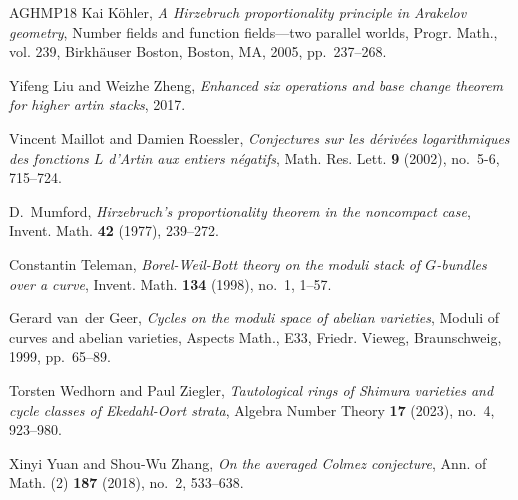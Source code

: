 \documentclass[reqno]{amsart}
\numberwithin{equation}{subsection}
\theoremstyle{definition}
\begin{document}
\begin{thebibliography}{AGHMP18}
Kai K\"{o}hler, \emph{A {H}irzebruch proportionality principle in {A}rakelov
  geometry}, Number fields and function fields---two parallel worlds, Progr.
  Math., vol. 239, Birkh\"{a}user Boston, Boston, MA, 2005, pp.~237--268.

Yifeng Liu and Weizhe Zheng, \emph{Enhanced six operations and base change
  theorem for higher artin stacks}, 2017.

Vincent Maillot and Damien Roessler, \emph{Conjectures sur les d\'{e}riv\'{e}es
  logarithmiques des fonctions {$L$} d'{A}rtin aux entiers n\'{e}gatifs}, Math.
  Res. Lett. \textbf{9} (2002), no.~5-6, 715--724.

D.~Mumford, \emph{Hirzebruch's proportionality theorem in the noncompact case},
  Invent. Math. \textbf{42} (1977), 239--272.

Constantin Teleman, \emph{Borel-{W}eil-{B}ott theory on the moduli stack of
  {$G$}-bundles over a curve}, Invent. Math. \textbf{134} (1998), no.~1, 1--57.

Gerard van~der Geer, \emph{Cycles on the moduli space of abelian varieties},
  Moduli of curves and abelian varieties, Aspects Math., E33, Friedr. Vieweg,
  Braunschweig, 1999, pp.~65--89.

Torsten Wedhorn and Paul Ziegler, \emph{Tautological rings of {S}himura
  varieties and cycle classes of {E}kedahl-{O}ort strata}, Algebra Number
  Theory \textbf{17} (2023), no.~4, 923--980.

Xinyi Yuan and Shou-Wu Zhang, \emph{On the averaged {C}olmez conjecture}, Ann.
  of Math. (2) \textbf{187} (2018), no.~2, 533--638.

\end{thebibliography}
\end{document}
